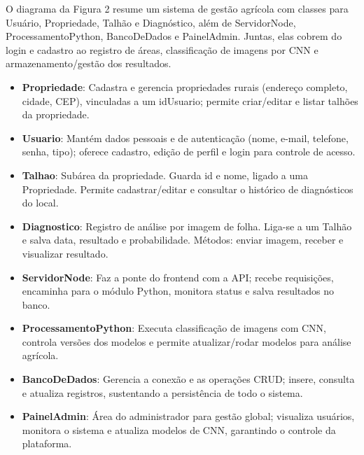 O diagrama da Figura 2 resume um sistema de gestão agrícola com classes para Usuário, Propriedade, Talhão e 
Diagnóstico, além de ServidorNode, ProcessamentoPython, BancoDeDados e PainelAdmin. Juntas, elas cobrem do 
login e cadastro ao registro de áreas, classificação de imagens por CNN e armazenamento/gestão dos resultados.

\medskip
{}
\begin{itemize}[itemsep=0.6em, topsep=0.3em, parsep=0pt]
    \item \textbf{Propriedade}: Cadastra e gerencia propriedades rurais (endereço completo, cidade, CEP), vinculadas a um idUsuario; permite criar/editar e listar talhões da propriedade.
    \item \textbf{Usuario}: Mantém dados pessoais e de autenticação (nome, e-mail, telefone, senha, tipo); oferece cadastro, edição de perfil e login para controle de acesso.
    \item \textbf{Talhao}: Subárea da propriedade. Guarda id e nome, ligado a uma Propriedade. Permite cadastrar/editar e consultar o histórico de diagnósticos do local.
    \item \textbf{Diagnostico}: Registro de análise por imagem de folha. Liga-se a um Talhão e salva data, resultado e probabilidade. Métodos: enviar imagem, receber e visualizar resultado.
    \item \textbf{ServidorNode}: Faz a ponte do frontend com a API; recebe requisições, encaminha para o módulo Python, monitora status e salva resultados no banco.
    \item \textbf{ProcessamentoPython}: Executa classificação de imagens com CNN, controla versões dos modelos e permite atualizar/rodar modelos para análise agrícola.
    \item \textbf{BancoDeDados}: Gerencia a conexão e as operações CRUD; insere, consulta e atualiza registros, sustentando a persistência de todo o sistema.
    \item \textbf{PainelAdmin}: Área do administrador para gestão global; visualiza usuários, monitora o sistema e atualiza modelos de CNN, garantindo o controle da plataforma.
\end{itemize}

